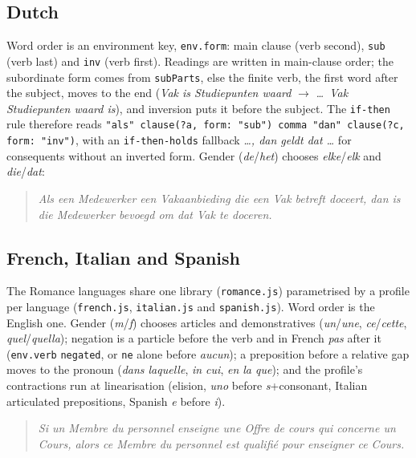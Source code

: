 \documentclass[11pt, a4paper]{article}
\newcommand{\code}[1]{\texttt{\color{codefg}#1}}
\begin{document}
\subsection{Dutch}

Word order is an environment key, \code{env.form}: main clause (verb
second), \code{sub} (verb last) and \code{inv} (verb first). Readings are
written in main-clause order; the subordinate form comes from
\code{subParts}, else the finite verb, the first word after the subject,
moves to the end (\textit{Vak is Studiepunten waard} $\to$ \textit{\ldots\
Vak Studiepunten waard is}), and inversion puts it before the subject. The
\code{if-then} rule therefore reads \code{"als" clause(?a, form: "sub") comma
"dan" clause(?c, form: "inv")}, with an \code{if-then-holds} fallback
\textit{\ldots, dan geldt dat \ldots} for consequents without an inverted
form. Gender (\textit{de}/\textit{het}) chooses \textit{elke}/\textit{elk}
and \textit{die}/\textit{dat}:

\begin{quote}
\textit{Als een Medewerker een Vakaanbieding die een Vak betreft doceert,
dan is die Medewerker bevoegd om dat Vak te doceren.}
\end{quote}

\subsection{French, Italian and Spanish}

The Romance languages share one library (\code{romance.js}) parametrised by
a profile per language (\code{french.js}, \code{italian.js} and \code{spanish.js}). Word order
is the English one. Gender (\textit{m}/\textit{f}) chooses articles and
demonstratives (\textit{un}/\textit{une}, \textit{ce}/\textit{cette},
\textit{quel}/\textit{quella}); negation is a particle before the verb and in
French \textit{pas} after it (\code{env.verb} \code{negated}, or \code{ne}
alone before \textit{aucun}); a preposition before a relative gap moves to
the pronoun (\textit{dans laquelle}, \textit{in cui}, \textit{en la que});
and the profile's contractions run at linearisation (elision, \textit{uno}
before \textit{s}+consonant, Italian articulated prepositions, Spanish
\textit{e} before \textit{i}).

\begin{quote}
\textit{Si un Membre du personnel enseigne une Offre de cours qui concerne
un Cours, alors ce Membre du personnel est qualifié pour enseigner ce
Cours.}
\end{quote}
\end{document}
